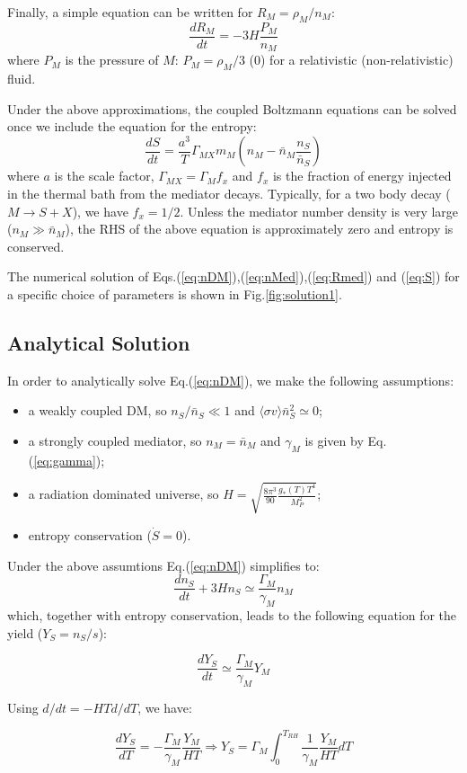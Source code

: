 \documentclass{article}
\def\to{\rightarrow}
\def\bi{\begin{itemize}}
\def\ei{\end{itemize}}
\def\be{\begin{equation}}
\def\ee{\end{equation}}
\def\to{\rightarrow}
\newcommand\Drv[2]{\frac{d #1}{d #2}}
\begin{document}
Finally, a simple equation can be written for $R_M = \rho_M/n_M$:
\be
\Drv{R_M}{t} = -3 H \frac{P_M}{n_M} \label{eq:Rmed}
\ee
where $P_M$ is the pressure of $M$: $P_M = \rho_M/3$ ($0$) for a relativistic (non-relativistic) fluid.

Under the above approximations, the coupled Boltzmann equations can be solved once we include
the equation for the entropy:
\be
\Drv{S}{t} = \frac{a^3}{T} \Gamma_{MX} m_M \left(n_M -\bar{n}_M \frac{n_S}{\bar{n}_S}\right) \label{eq:S}
\ee
where $a$ is the scale factor, $\Gamma_{MX} = \Gamma_M f_x$ and $f_x$ is the fraction
of energy injected in the thermal bath from the mediator decays. Typically,
for a two body decay ($M \to S + X$), we have $f_x = 1/2$.
Unless the mediator number density is very large ($n_M \gg \bar{n}_M$), the RHS of the above equation is approximately
zero and entropy is conserved.

The numerical solution of Eqs.(\ref{eq:nDM}),(\ref{eq:nMed}),(\ref{eq:Rmed}) and (\ref{eq:S})
for a specific choice of parameters is shown in Fig.\ref{fig:solution1}.



\subsection{Analytical Solution} \label{sec:analytic}

In order to analytically solve Eq.(\ref{eq:nDM}), we make the following assumptions:
\bi
\item a  weakly coupled DM, so $n_S/\bar{n}_S \ll 1$ and  $\langle \sigma v \rangle \bar{n}_S^2 \simeq 0$;
\item a strongly coupled mediator, so $n_M = \bar{n}_M$ and $\gamma_M$ is given by Eq.(\ref{eq:gamma});
\item a radiation dominated universe, so $H=\sqrt{\frac{8 \pi^3}{90}\frac{g_*(T) T^4}{M_P^2}}$;
\item entropy conservation ($\dot{S} = 0$).
\ei

Under the above assumtions Eq.(\ref{eq:nDM}) simplifies to:
\be
\Drv{n_{S}}{t} + 3H n_S  \simeq  \frac{\Gamma_M}{\gamma_M}  n_M
\ee
which, together with entropy conservation, leads to the following equation for the yield ($Y_S = n_S/s$):

\be
\Drv{Y_{S}}{t}  \simeq  \frac{\Gamma_M}{\gamma_M}  Y_M
\ee

Using $d/dt = -H T d/dT$, we have:

\be
\Drv{Y_S}{T} = -\frac{\Gamma_M}{\gamma_M}  \frac{Y_M}{H T} \Rightarrow Y_S = \Gamma_M   \int^{T_{RH}}_{0} \frac{1}{\gamma_M} \frac{Y_M}{H T} dT
\ee
\end{document}
